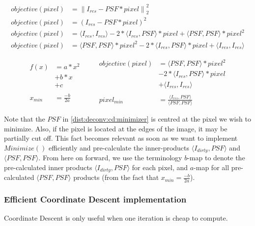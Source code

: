 \begin{equation} \label{dist:deconv:cd:derivation}
\begin{split}
objective(pixel) & = \left \| I_{res} - PSF * pixel \right \|_2^2\\
objective(pixel) & = (I_{res} - PSF * pixel)^2\\
objective(pixel) & = \langle I_{res}, I_{res} \rangle - 2*\langle I_{res},PSF\rangle * pixel + \langle PSF, PSF \rangle * pixel^2\\
objective(pixel) & = \langle PSF, PSF \rangle * pixel^2 - 2*\langle I_{res},PSF\rangle * pixel + \langle I_{res}, I_{res} \rangle
\end{split}
\end{equation}

\begin{equation} \label{dist:deconv:cd:minimizer}
\begin{split}
f(x) & = a*x^2 \\
 & + b*x \\
 & + c\\
 \\
x_{min} & = \frac{-b}{2a}
\end{split}
\quad \quad
\begin{split}
objective(pixel) & = \langle PSF, PSF \rangle * pixel^2 \\
 & - 2*\langle I_{res},PSF\rangle * pixel \\
 &+ \langle I_{res}, I_{res} \rangle\\
 \\
pixel_{min} & = \frac{\langle I_{res},PSF\rangle}{\langle PSF, PSF \rangle}
\end{split}
\end{equation}

Note that the $PSF$ in \eqref{dist:deconv:cd:minimizer} is centred at the pixel we wish to minimize. Also, if the pixel is located at the edges of the image, it may be partially cut off. This fact becomes relevant as soon as we want to implement $Minimize()$ efficiently and pre-calculate the inner-products $\langle I_{dirty},PSF\rangle$ and $\langle PSF, PSF \rangle$. From here on forward, we use the terminology $b$-map to denote the pre-calculated inner products $\langle I_{dirty},PSF\rangle$ for each pixel, and $a$-map for all pre-calculated $\langle PSF, PSF \rangle$ products (from the fact that $x_{min} = \frac{-b}{2a}$). 


\subsubsection{Efficient Coordinate Descent implementation}\label{dist:deconv:efficient}
Coordinate Descent is only useful when one iteration is cheap to compute.

